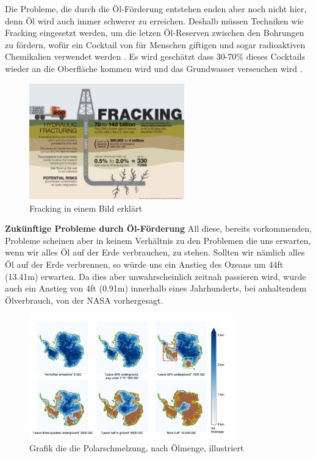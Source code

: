 Die Probleme, die durch die Öl-Förderung entstehen enden aber noch nicht hier, denn Öl wird auch immer schwerer zu erreichen. Deshalb müssen Techniken wie Fracking eingesetzt werden, um die letzen Öl-Reserven zwischen den Bohrungen zu fördern, wofür ein Cocktail von für Menschen giftigen und sogar radioaktiven Chemikalien verwendet werden \cite{SIMR.CH2-motorwirkungsgrad.FrackingChemicals}. Es wird geschätzt dass 30-70\% dieses Cocktails wieder an die Oberfläche kommen wird und das Grundwasser verseuchen wird \cite{SIMR.CH2-motorwirkungsgrad.FrackingGroundwater}.

\begin{figure}[!h]\centering
	\includegraphics[width=0.6\textwidth]{images/frackingInfographic}
	\caption{Fracking in einem Bild erklärt \cite{SIMR.CH2-motorwirkungsgrad.frackingDescription}}\label{Fig:imgFrackingDesc}
\end{figure}

\newpage
\textbf{Zukünftige Probleme durch Öl-Förderung\nextline}
All diese, bereits vorkommenden, Probleme scheinen aber in keinem Verhältnis zu den Problemen die uns erwarten, wenn wir alles Öl auf der Erde verbrauchen, zu stehen. Sollten wir nämlich alles Öl auf der Erde verbrennen, so würde uns ein Anstieg des Ozeans um 44ft (13.41m) erwarten. \cite{SIMR.CH2-motorwirkungsgrad.SeaLevelRiseAllOilBurnt} Da dies aber unwahrscheinlich zeitnah passieren wird, wurde auch ein Anstieg von 4ft (0.91m) innerhalb eines Jahrhunderts, bei anhaltendem Ölverbrauch, von der NASA vorhergesagt. \cite{SIMR.CH2-motorwirkungsgrad.SeaLevelRiseCentury}

\begin{figure}[!htb]\centering
	\includegraphics[width=0.8\textwidth]{images/greenlandSeaLevel}
	\caption{Grafik die die Polarschmelzung, nach Ölmenge, illustriert \cite{SIMR.CH2-motorwirkungsgrad.SeaLevelRiseAllOilBurnt}}\label{Fig:imgGreenlandMelting}
\end{figure}

